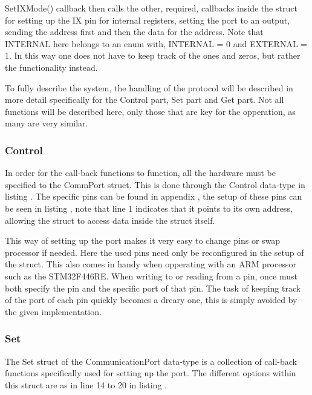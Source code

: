 SetIXMode() callback then calls the other, required, callbacks inside the struct for setting up the IX pin for internal registers, setting the port to an output, sending the address first and then the data for the address. Note that INTERNAL here belongs to an enum with, INTERNAL = 0 and EXTERNAL = 1. In this way one does not have to keep track of the ones and zeros, but rather the functionality instead.

To fully describe the system, the handling of the protocol will be described in more detail specifically for the Control part, Set part and Get part. Not all functions will be described here, only those that are key for the opperation, as many are very similar.

\subsubsection{Control}
In order for the call-back functions to function, all the hardware must be specified to the CommPort struct. This is done through the Control data-type in listing . The specific pins can be found in appendix , the setup of these pins can be seen in listing , note that line 1 indicates that it points to its own address, allowing the struct to access data inside the struct itself.



This way of setting up the port makes it very easy to change pins or swap processor if needed. Here the used pins need only be reconfigured in the setup of the struct. This also comes in handy when opperating with an ARM processor such as the STM32F446RE. When writing to or reading from a pin, once must both specify the pin and the specific port of that pin. The task of keeping track of the port of each pin quickly becomes a dreary one, this is simply avoided by the given implementation.

\subsubsection{Set}
The Set struct of the CommunicationPort data-type is a collection of call-back functions specifically used for setting up the port. The different options within this struct are as in line 14 to 20 in listing .

